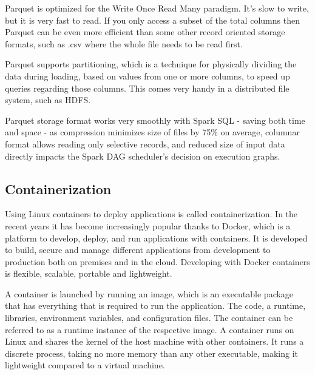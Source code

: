 Parquet is optimized for the Write Once Read Many paradigm. It's slow to write, but it is very fast to read. If you only access a subset of the total columns then Parquet can be even more efficient than some other record oriented storage formats, such as .csv where the whole file needs to be read first. 

Parquet supports partitioning, which is a technique for physically dividing the data during loading, based on values from one or more columns, to speed up queries regarding those columns. This comes very handy in a distributed file system, such as HDFS.

Parquet storage format works very smoothly with Spark SQL - saving both time and space - as compression minimizes size of files by 75\% on average, columnar format allows reading only selective records, and reduced size of input data directly impacts the Spark DAG scheduler's decision on execution graphs. \cite{ibm_parquet}

\subsection{Containerization}
Using Linux containers to deploy applications is called containerization. In the recent years it has become increasingly popular thanks to Docker, which is a platform to develop, deploy, and run applications with containers. It is developed to build, secure and manage different applications from development to production both on premises and in the cloud. Developing with Docker containers is flexible, scalable, portable and lightweight.

A container is launched by running an image, which is an executable package that has everything that is required to run the application. The code, a runtime, libraries, environment variables, and configuration files. The container can be referred to as a runtime instance of the respective image. A container runs on Linux and shares the kernel of the host machine with other containers. It runs a discrete process, taking no more memory than any other executable, making it lightweight compared to a virtual machine.\cite{docker}